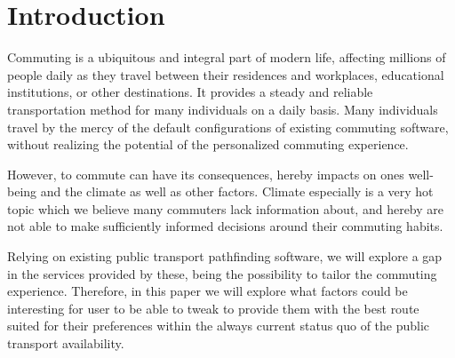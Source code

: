 \chapter{Introduction}\label{ch:introduction}

Commuting is a ubiquitous and integral part of modern life, affecting millions of people daily as they travel between
their residences and workplaces, educational institutions, or other destinations.
It provides a steady and reliable transportation method for many individuals on a daily basis.
Many individuals travel by the mercy of the default configurations of existing commuting software, without realizing the
potential of the personalized commuting experience.

However, to commute can have its consequences, hereby impacts on ones well-being and the climate as well as other
factors.
Climate especially is a very hot topic which we believe many commuters lack information about, and hereby are not able
to make sufficiently informed decisions around their commuting habits.

Relying on existing public transport pathfinding software, we will explore a gap in the services provided by these,
being the possibility to tailor the commuting experience.
Therefore, in this paper we will explore what factors could be interesting for user to be able to tweak to provide them
with the best route suited for their preferences within the always current status quo of the public transport
availability.
